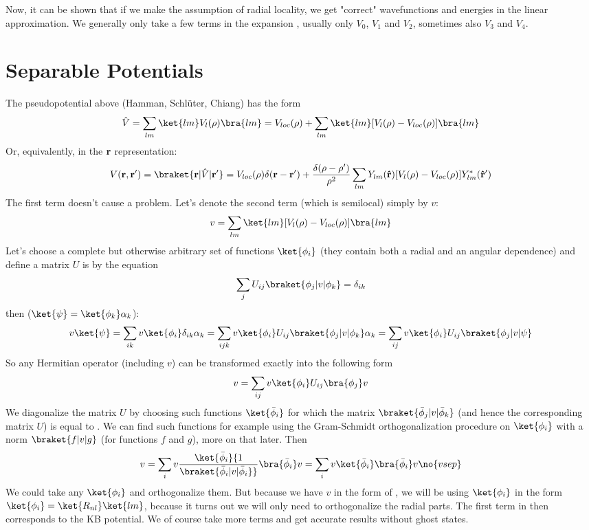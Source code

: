 Now, it can be shown that if we make the assumption of radial locality, we get
"correct" wavefunctions and energies in the linear approximation. We generally
only take a few terms in the expansion , usually only $V_0$,
$V_1$ and $V_2$, sometimes also $V_3$ and $V_4$.

\section{Separable Potentials}

The pseudopotential above (Hamman, Schl\"uter, Chiang) has the form
$$\hat V=\sum_{lm} \ket{lm}V_l(\rho)\bra{lm}
=V_{loc}(\rho)+\sum_{lm} \ket{lm}[V_l(\rho)-V_{loc}(\rho)]\bra{lm}$$
Or, equivalently, in the $\bf r$ representation:
$$V({\bf r},{\bf r'})=\braket{{\bf r}|\hat V|{\bf r'}}=
V_{loc}(\rho)\delta({\bf r}-{\bf r'})+{\delta(\rho-\rho')\over\rho^2}
\sum_{lm}Y_{lm}({\bf\hat r})[V_l(\rho)-V_{loc}(\rho)]Y_{lm}^*({\bf\hat r'})$$
The first term doesn't cause a problem. Let's denote the second term (which is
semilocal) simply by $v$:
$$v=\sum_{lm} \ket{lm}[V_l(\rho)-V_{loc}(\rho)]\bra{lm}$$
Let's choose a complete but otherwise arbitrary set of functions
$\ket{\phi_i}$ (they contain both a radial and an angular dependence) and
define a matrix $U$ is by the equation
$$\sum_j U_{ij}\braket{\phi_j|v|\phi_k}=\delta_{ik}$$
then ($\ket{\psi}=\ket{\phi_k}\alpha_k$):
$$v\ket{\psi}
=\sum_{ik}v\ket{\phi_i}\delta_{ik}\alpha_k
=\sum_{ijk}v\ket{\phi_i}U_{ij}\braket{\phi_j|v|\phi_k}\alpha_k
=\sum_{ij}v\ket{\phi_i}U_{ij}\braket{\phi_j|v|\psi}
$$
So any Hermitian operator (including $v$) can be transformed exactly into the
following form
$$v=\sum_{ij}v\ket{\phi_i}U_{ij}\bra{\phi_j}v$$
We diagonalize the matrix $U$ by choosing
such functions $\ket{\bar\phi_i}$ for which the matrix
$\braket{\bar\phi_j|v|\bar\phi_k}$ (and hence the corresponding matrix $U$) is
equal to \one. We can find such functions for example using the Gram-Schmidt
orthogonalization procedure on $\ket{\phi_i}$ with a norm $\braket{f|v|g}$ (for
functions $f$ and $g$), more on that later. Then 
$$v
=\sum_{i}v\ket{\bar\phi_i}{1\over\braket{\bar\phi_i|v|\bar\phi_i}}
\bra{\bar\phi_i}v 
=\sum_{i}v\ket{\bar\phi_i}\bra{\bar\phi_i}v 
\no{vsep}$$
We could take any $\ket{\phi_i}$ and orthogonalize them. But because we have
$v$ in the form of , we will be using $\ket{\phi_i}$ in the form
$\ket{\phi_i}=\ket{R_{nl}}\ket{lm}$, because it turns out we will only need to orthogonalize the radial
parts. The first term in  then corresponds to
the KB potential. We of course take more terms and get accurate results without
ghost states.


